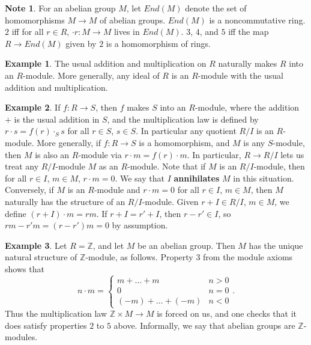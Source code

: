 \documentclass{article}
\newcommand{\Z}{\mathbb{Z}}
\newcommand{\rb}[1]{\left( #1 \right)}
\theoremstyle{definition}\newtheorem{definition}{Definition}[subsection]
\theoremstyle{definition}\newtheorem{remark}[definition]{Remark}
\theoremstyle{definition}\newtheorem*{example}{Example}
\theoremstyle{definition}\newtheorem*{note}{Note}
\begin{document}
\begin{note}
For an abelian group $ M $, let $ End\rb{M} $ denote the set of homomorphisms $ M \to M $ of abelian groups. $ End\rb{M} $ is a noncommutative ring. $ 2 $ iff for all $ r \in R $, $ \cdot r : M \to M $ lives in $ End\rb{M} $. $ 3 $, $ 4 $, and $ 5 $ iff the map $ R \to End\rb{M} $ given by $ 2 $ is a homomorphism of rings.
\end{note}

\begin{example}
The usual addition and multiplication on $ R $ naturally makes $ R $ into an $ R $-module. More generally, any ideal of $ R $ is an $ R $-module with the usual addition and multiplication.
\end{example}

\begin{example}
If $ f : R \to S $, then $ f $ makes $ S $ into an $ R $-module, where the addition $ + $ is the usual addition in $ S $, and the multiplication law is defined by $ r \cdot s = f\rb{r} \cdot_S s $ for all $ r \in S $, $ s \in S $. In particular any quotient $ R / I $ is an $ R $-module. More generally, if $ f : R \to S $ is a homomorphism, and $ M $ is any $ S $-module, then $ M $ is also an $ R $-module via $ r \cdot m = f\rb{r} \cdot m $. In particular, $ R \to R / I $ lets us treat any $ R / I $-module $ M $ as an $ R $-module. Note that if $ M $ is an $ R / I $-module, then for all $ r \in I $, $ m \in M $, $ r \cdot m = 0 $. We say that $ I $ \textbf{annihilates} $ M $ in this situation. Conversely, if $ M $ is an $ R $-module and $ r \cdot m = 0 $ for all $ r \in I $, $ m \in M $, then $ M $ naturally has the structure of an $ R / I $-module. Given $ r + I \in R / I $, $ m \in M $, we define $ \rb{r + I} \cdot m = rm $. If $ r + I = r' + I $, then $ r - r' \in I $, so $ rm - r'm = \rb{r - r'}m = 0 $ by assumption.
\end{example}

\begin{example}
Let $ R = \Z $, and let $ M $ be an abelian group. Then $ M $ has the unique natural structure of $ \Z $-module, as follows. Property $ 3 $ from the module axioms shows that
$$ n \cdot m = \begin{cases} m + \dots + m & n > 0 \\ 0 & n = 0 \\ \rb{-m} + \dots + \rb{-m} & n < 0 \end{cases}. $$
Thus the multiplication law $ \Z \times M \to M $ is forced on us, and one checks that it does satisfy properties $ 2 $ to $ 5 $ above. Informally, we say that abelian groups are $ \Z $-modules.
\end{example}
\end{document}
